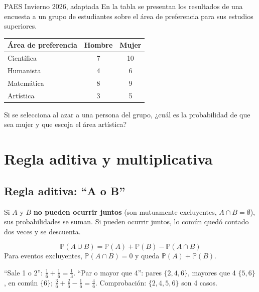 
\begin{elejemplo}{PAES Invierno 2026, adaptada}
En la tabla se presentan los resultados de una encuesta a un grupo de estudiantes sobre el área de preferencia para sus estudios superiores.
\begin{center}\small
\begin{tabular}{@{}lcc@{}}\toprule
Área de preferencia & Hombre & Mujer\\\midrule
Científica & 7 & 10\\ Humanista & 4 & 6\\ Matemática & 8 & 9\\ Artística & 3 & 5\\\bottomrule
\end{tabular}
\end{center}
Si se selecciona al azar a una persona del grupo, ¿cuál es la probabilidad de que sea mujer y que escoja el área artística?
\end{elejemplo}

\section{Regla aditiva y multiplicativa}

\subsection{Regla aditiva: ``A o B''}
Si $A$ y $B$ \textbf{no pueden ocurrir juntos} (son mutuamente excluyentes, $A\cap B = \emptyset$), sus probabilidades se suman. Si pueden ocurrir juntos, lo común quedó contado dos veces y se descuenta.
\begin{clave} \[ \mathbb{P}(A\cup B) = \mathbb{P}(A) + \mathbb{P}(B) - \mathbb{P}(A\cap B) \]
Para eventos excluyentes, $\mathbb{P}(A\cap B) = 0$ y queda $\mathbb{P}(A) + \mathbb{P}(B)$.\end{clave}
\begin{ejemplo} ``Sale 1 o 2'': $\frac16 + \frac16 = \frac13$. ``Par o mayor que 4'': pares $\{2,4,6\}$, mayores que 4 $\{5,6\}$, en común $\{6\}$; $\frac36 + \frac26 - \frac16 = \frac46$. Comprobación: $\{2,4,5,6\}$ son 4 casos.\end{ejemplo}

